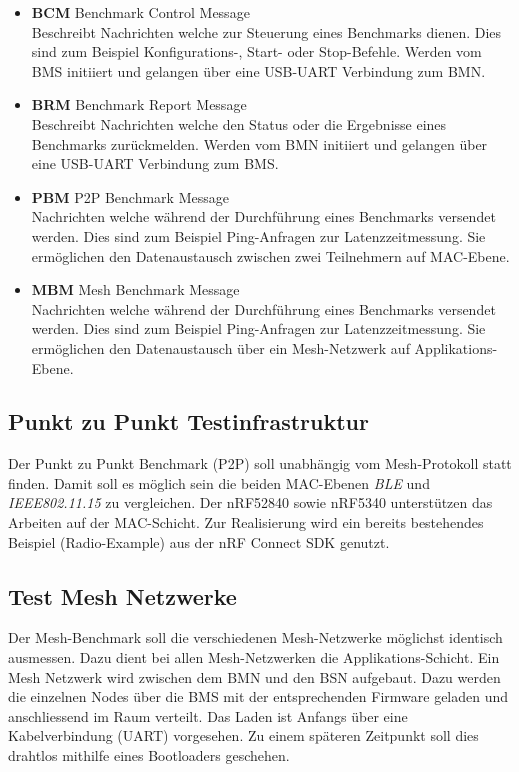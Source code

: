 \begin{itemize}
	\item \textbf{BCM} Benchmark Control Message \\ 
	Beschreibt Nachrichten welche zur Steuerung eines Benchmarks dienen. Dies sind zum Beispiel Konfigurations-, Start- oder Stop-Befehle. Werden vom BMS  initiiert und gelangen über eine USB-UART Verbindung zum BMN. 
	\item \textbf{BRM} Benchmark Report Message \\ 
	Beschreibt Nachrichten welche den Status oder die Ergebnisse eines Benchmarks zurückmelden. Werden vom BMN initiiert und gelangen über eine USB-UART Verbindung zum BMS.
	\item \textbf{PBM} P2P Benchmark Message \\ 
	Nachrichten welche während der Durchführung eines Benchmarks versendet werden. Dies sind zum Beispiel Ping-Anfragen zur Latenzzeitmessung. Sie ermöglichen den Datenaustausch zwischen zwei Teilnehmern auf MAC-Ebene. 
	\item \textbf{MBM} Mesh Benchmark Message \\ 
	Nachrichten welche während der Durchführung eines Benchmarks versendet werden. Dies sind zum Beispiel Ping-Anfragen zur Latenzzeitmessung. Sie ermöglichen den Datenaustausch über ein Mesh-Netzwerk auf Applikations-Ebene. 
\end{itemize}

\subsection{Punkt zu Punkt Testinfrastruktur}\label{subsec:PunktzuPunktTestinfrastruktur}

Der Punkt zu Punkt Benchmark (P2P) soll unabhängig vom Mesh-Protokoll statt finden. Damit soll es möglich sein die beiden MAC-Ebenen \textit{BLE} und \textit{IEEE802.11.15} zu vergleichen. Der nRF52840 sowie nRF5340 unterstützen das Arbeiten auf der MAC-Schicht. Zur Realisierung wird ein bereits bestehendes Beispiel (Radio-Example) aus der nRF Connect SDK genutzt.


\subsection{Test Mesh Netzwerke}\label{subsec:TestMeshNetzwerke}

Der Mesh-Benchmark soll die verschiedenen Mesh-Netzwerke möglichst identisch ausmessen. Dazu dient bei allen Mesh-Netzwerken die Applikations-Schicht. Ein Mesh Netzwerk wird zwischen dem BMN und den BSN aufgebaut. Dazu werden die einzelnen Nodes über die BMS mit der entsprechenden Firmware geladen und anschliessend im Raum verteilt. Das Laden ist Anfangs über eine Kabelverbindung (UART) vorgesehen. Zu einem späteren Zeitpunkt soll dies drahtlos mithilfe eines Bootloaders geschehen. 

